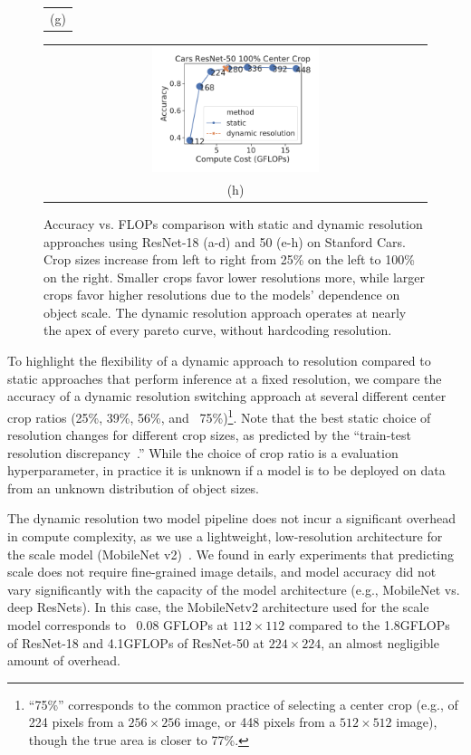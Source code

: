\begin{figure}[t]
\begin{tabular}{@{}c@{}}
    \small (g)
    \end{tabular}
    \begin{tabular}{@{}c@{}}
    \includegraphics[width=0.45\textwidth]{e2e_figures/cars_resnet50_full_center.pdf} \\
    \small (h)
    \end{tabular}
    \caption{Accuracy vs. FLOPs comparison with static and dynamic resolution approaches using ResNet-18 (a-d) and 50 (e-h) on Stanford Cars. Crop sizes increase from left to right from 25\% on the left to 100\% on the right. Smaller crops favor lower resolutions more, while larger crops favor higher resolutions due to the models' dependence on object scale. The dynamic resolution approach operates at nearly the apex of every pareto curve, without hardcoding resolution.}
    \label{fig:accflops_resnet_cars}
\end{figure}
 To highlight the flexibility of a dynamic approach to resolution compared to static approaches that perform inference at a fixed resolution, we compare the accuracy of a dynamic resolution switching approach at several different center crop ratios (25\%, 39\%, 56\%, and ~75\%)\footnote{``75\%'' corresponds to the common practice of selecting a center crop (e.g., of 224 pixels from a $256\times256$ image, or 448 pixels from a $512\times512$ image), though the true area is closer to 77\%.}.
 Note that the best static choice of resolution changes for different crop sizes, as predicted by the ``train-test resolution discrepancy~\cite{touvron2019fixing}.''
While the choice of crop ratio is a evaluation hyperparameter, in practice it is unknown if a model is to be deployed on data from an unknown distribution of object sizes.

The dynamic resolution two model pipeline does not incur a significant overhead in compute complexity, as we use a lightweight, low-resolution architecture for the scale model (MobileNet v2)~\cite{sandler2018mobilenetv2}. 
We found in early experiments that predicting scale does not require fine-grained image details, and model accuracy did not vary significantly with the capacity of the model architecture (e.g., MobileNet vs. deep ResNets). 
In this case, the MobileNetv2 architecture used for the scale model corresponds to ~0.08 GFLOPs at $112\times112$ compared to the 1.8GFLOPs of ResNet-18 and 4.1GFLOPs of ResNet-50 at $224\times224$, an almost negligible amount of overhead.


